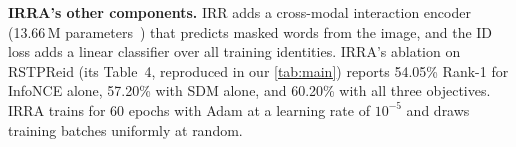 \textbf{IRRA's other components.} IRR adds a cross-modal interaction encoder (13.66\,M parameters~\cite{jiang2023crossmodalimplicitrelationreasoning}) that predicts masked words from the image, and the ID loss adds a linear classifier over all training identities. IRRA's ablation on RSTPReid (its Table~4, reproduced in our \cref{tab:main}) reports 54.05\% Rank-1 for InfoNCE alone, 57.20\% with SDM alone, and 60.20\% with all three objectives. IRRA trains for 60 epochs with Adam at a learning rate of $10^{-5}$ and draws training batches uniformly at random.
